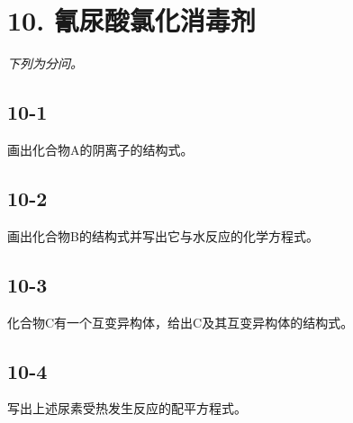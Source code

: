 \section*{10. 氰尿酸氯化消毒剂}
\textit{下列为分问。}

\subsection*{10-1}
画出化合物A的阴离⼦的结构式。

\subsection*{10-2}
画出化合物B的结构式并写出它与⽔反应的化学⽅程式。

\subsection*{10-3}
化合物C有⼀个互变异构体，给出C及其互变异构体的结构式。

\subsection*{10-4}
写出上述尿素受热发⽣反应的配平⽅程式。
